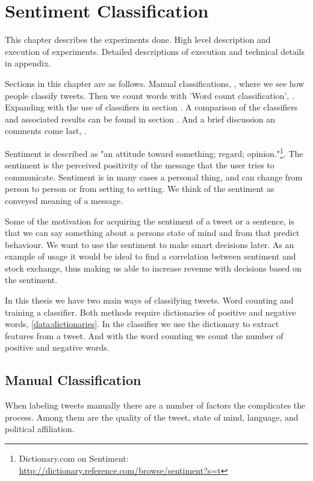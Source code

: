 
\chapter{Sentiment Classification}
This chapter describes the experiments done. High level description and
execution of experiments. Detailed descriptions of execution and technical
details in appendix. 

Sections in this chapter are as follows. Manual classifications,
\label{sentiment:manual_classification}, where we see how people classify
tweets. Then we count words with 'Word count classification',
\label{sentiment:word_count_classification}. Expanding with the use of
classifiers in section \label{sentiment:classifier_classification}. A
comparison of the classifiers and associated results can be found in section
\label{sentiment:comparison_results}. And a brief discussion an comments come
last, \label{sentiment:comments_discussion}.

Sentiment is described as "an attitude toward something; regard;
opinion."\footnote{ Dictionary.com on Sentiment:
\url{http://dictionary.reference.com/browse/sentiment?s=t}}. The sentiment is the perceived positivity of the message that the user tries to
communicate. Sentiment is in many cases a personal thing, and can change from
person to person or from setting to setting. We think of the sentiment as
conveyed meaning of a message. 

Some of the motivation for acquiring the sentiment of a tweet or a sentence, is
that we can say something about a persons state of mind and from that predict
behaviour. We want to use the sentiment to make smart decisions later. As an
example of usage it would be ideal to find a correlation between sentiment and
stock exchange, thus making us able to increase revenue with decisions
based on the sentiment. 

In this thesis we have two main ways of classifying tweets. Word counting and
training a classifier. Both methods require dictionaries of positive and
negative words, \ref{data:dictionaries}. In the classifier we use the dictionary
to extract features from a tweet. And with the word counting we count the
number of positive and negative words. 

\section{Manual Classification}\label{sentiment:manual_classification}
When labeling tweets manually there are a number of factors the complicates the
process. Among them are the quality of the tweet, state of mind, language, and
political affiliation.

